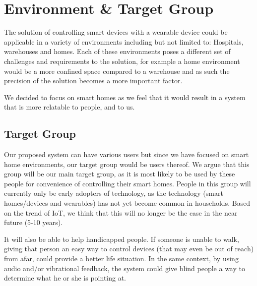 \section{Environment \& Target Group}

The solution of controlling smart devices with a wearable device could be applicable in a variety of environments including but not limited to: Hospitals, warehouses and homes.
Each of these environments poses a different set of challenges and requirements to the solution, for example a home environment would be a more confined space compared to a warehouse and as such the precision of the solution becomes a more important factor.

We decided to focus on smart homes as we feel that it would result in a system that is more relatable to people, and to us.

\subsection{Target Group}
Our proposed system can have various users but since we have focused on smart home environments, 
our target group would be users thereof. 
We argue that this group will be our main target group, 
as it is most likely to be used by these people for convenience of controlling their smart homes. 
People in this group will currently only be early adopters of technology, 
as the technology (smart homes/devices and wearables) has not yet become common in households.
Based on the trend of IoT, we think that this will no longer be the case in the near future (5-10 years). 

It will also be able to help handicapped people. 
If someone is unable to walk, 
giving that person an easy way to control devices (that may even be out of reach) from afar, 
could provide a better life situation. 
In the same context, by using audio and/or vibrational feedback, 
the system could give blind people a way to determine what he or she is pointing at. 
